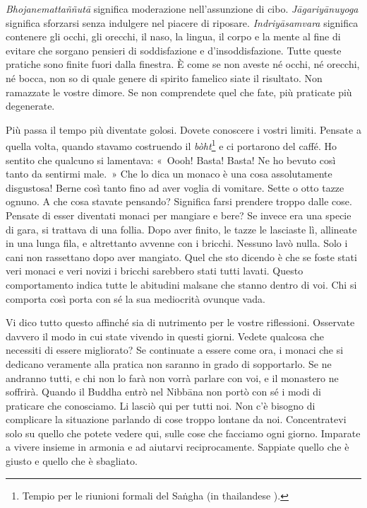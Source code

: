 \emph{Bhojanemattaññutā} significa moderazione nell'assunzione di cibo.
\emph{Jāgariyānuyoga} significa sforzarsi senza indulgere nel piacere di
riposare. \emph{Indriyāsamvara} significa contenere gli occhi, gli
orecchi, il naso, la lingua, il corpo e la mente al fine di evitare che
sorgano pensieri di soddisfazione e d'insoddisfazione. Tutte queste
pratiche sono finite fuori dalla finestra. È come se non aveste né
occhi, né orecchi, né bocca, non so di quale genere di spirito famelico
siate il risultato. Non ramazzate le vostre dimore. Se non comprendete
quel che fate, più praticate più degenerate.

Più passa il tempo più diventate golosi. Dovete conoscere i vostri
limiti. Pensate a quella volta, quando stavamo costruendo il
\emph{bòht}\footnote{Tempio per le riunioni formali del Saṅgha (in
  thailandese ).} e ci portarono del caffé. Ho sentito che qualcuno
si lamentava: «~Oooh! Basta! Basta! Ne ho bevuto così tanto da sentirmi
male.~» Che lo dica un monaco è una cosa assolutamente disgustosa! Berne
così tanto fino ad aver voglia di vomitare. Sette o otto tazze ognuno. A
che cosa stavate pensando? Significa farsi prendere troppo dalle cose.
Pensate di esser diventati monaci per mangiare e bere? Se invece era una
specie di gara, si trattava di una follia. Dopo aver finito, le tazze le
lasciaste lì, allineate in una lunga fila, e altrettanto avvenne con i
bricchi. Nessuno lavò nulla. Solo i cani non rassettano dopo aver
mangiato. Quel che sto dicendo è che se foste stati veri monaci e veri
novizi i bricchi sarebbero stati tutti lavati. Questo comportamento
indica tutte le abitudini malsane che stanno dentro di voi. Chi si
comporta così porta con sé la sua mediocrità ovunque vada.

Vi dico tutto questo affinché sia di nutrimento per le vostre
riflessioni. Osservate davvero il modo in cui state vivendo in questi
giorni. Vedete qualcosa che necessiti di essere migliorato? Se
continuate a essere come ora, i monaci che si dedicano veramente alla
pratica non saranno in grado di sopportarlo. Se ne andranno tutti, e chi
non lo farà non vorrà parlare con voi, e il monastero ne soffrirà.
Quando il Buddha entrò nel Nibbāna non portò con sé i modi di
praticare che conosciamo. Li lasciò qui per tutti noi. Non c'è bisogno
di complicare la situazione parlando di cose troppo lontane da noi.
Concentratevi solo su quello che potete vedere qui, sulle cose che
facciamo ogni giorno. Imparate a vivere insieme in armonia e ad aiutarvi
reciprocamente. Sappiate quello che è giusto e quello che è sbagliato.

